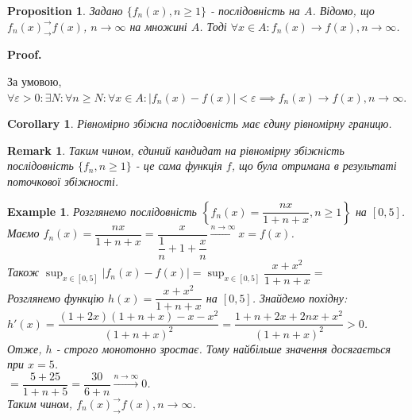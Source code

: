 \documentclass[a4paper, 10pt]{article}
\makeatletter
\def\huge{\displaystyle}
\def\qed{$\blacksquare$}
\theoremstyle{theoremdd}
\theoremstyle{theoremdd}
\theoremstyle{theoremdd}
\theoremstyle{theoremdd}
\theoremstyle{theoremdd}
\newtheorem{example}[theorem]{Example}
\theoremstyle{theoremdd}
\newtheorem{proposition}[theorem]{Proposition}
\theoremstyle{theoremdd}
\newtheorem{remark}[theorem]{Remark}
\theoremstyle{theoremdd}
\theoremstyle{theoremdd}
\newtheorem{corollary}[theorem]{Corollary}
\renewenvironment{proof}[1][Proof.\\]{\par
\pushQED{\hfill \qed}%
\normalfont \topsep6\p@\@plus6\p@\relax
\trivlist
\item\relax
{\bfseries
#1\@addpunct{.}}\hspace\labelsep\ignorespaces
}{%
\popQED\endtrivlist\@endpefalse
}
\makeatother
\begin{document}
\begin{proposition}
Задано $\{f_n(x), n \geq 1\}$ - послідовність на $A$. Відомо, що $f_n(x)^\rightarrow_\rightarrow f(x)$, $n \to \infty$ на множині $A$. Тоді $\forall x \in A: f_n(x) \to f(x), n \to \infty$.
\end{proposition}

\begin{proof}
За умовою, $\forall \varepsilon > 0: \exists N: \forall n \geq N: \forall x \in A: |f_n(x) - f(x)| < \varepsilon \implies f_n(x) \to f(x), n \to \infty$.
\end{proof}

\begin{corollary}
Рівномірно збіжна послідовність має єдину рівномірну границю.
\end{corollary}

\begin{remark}
Таким чином, єдиний кандидат на рівномірну збіжність послідовність $\{f_n, n \geq 1\}$ - це сама функція $f$, що була отримана в результаті поточкової збіжності.
\end{remark}

\begin{example}
Розглянемо послідовність $\left\{ f_n(x) = \dfrac{nx}{1+n+x}, n \geq 1 \right\}$ на $[0,5]$.\\
Маємо $f_n(x) = \dfrac{nx}{1+n+x} = \dfrac{x}{\dfrac{1}{n}+ 1 + \dfrac{x}{n}} \overset{n \to \infty}{\longrightarrow} x = f(x)$.\\
Також $\huge\sup_{x \in [0,5]} |f_n(x) - f(x)| = \sup_{x \in [0,5]} \dfrac{x+x^2}{1+n+x} \boxed{=}$\\
Розглянемо функцію $h(x) = \dfrac{x+x^2}{1+n+x}$ на $[0,5]$. Знайдемо похідну:\\
$h'(x) = \dfrac{(1+2x)(1+n+x) - x-x^2}{(1+n+x)^2} = \dfrac{1+n+2x+2nx+x^2}{(1+n+x)^2} > 0$.\\
Отже, $h$ - строго монотонно зростає. Тому найбільше значення досягається при $x = 5$.\\
$\boxed{=} \dfrac{5+25}{1+n+5} = \dfrac{30}{6+n} \overset{n \to \infty}{\longrightarrow} 0$.\\
Таким чином, $f_n(x)^\rightarrow_\rightarrow f(x), n \to \infty$.
\end{example}
\end{document}
